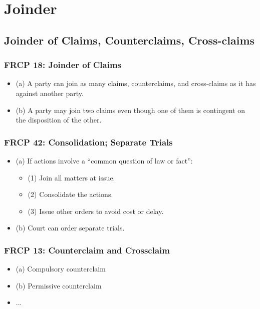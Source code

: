 \section{Joinder}

\subsection{Joinder of Claims, Counterclaims, Cross-claims}

\subsubsection{FRCP 18: Joinder of Claims}

\begin{itemize}
    \item (a) A party can join as many claims, counterclaims, and cross-claims 
    as it has against another party.
    \item (b) A party may join two claims even though one of them is 
    contingent on the disposition of the other.
\end{itemize}

\subsubsection{FRCP 42: Consolidation; Separate Trials}

\begin{itemize}
    \item (a) If actions involve a ``common question of law or fact'':
    \begin{itemize}
        \item (1) Join all matters at issue.
        \item (2) Consolidate the actions.
        \item (3) Issue other orders to avoid cost or delay.
    \end{itemize}
    \item (b) Court can order separate trials.
\end{itemize}

\subsubsection{FRCP 13: Counterclaim and Crossclaim}

\begin{itemize}
    \item (a) Compulsory counterclaim
    \item (b) Permissive counterclaim
    \item ... %
\end{itemize}

